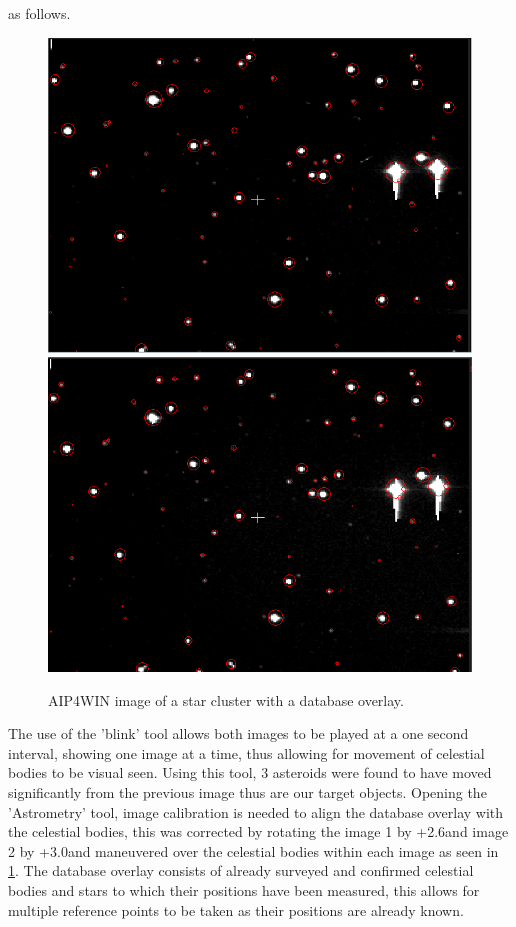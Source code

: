 \documentclass[12pt]{article}
\begin{document}
as follows.

\begin{figure}[H]
\begin{multicols}{2}
\centering
\includegraphics[scale=0.5]{Images/S2/dcdoverlay.PNG}
\includegraphics[scale=0.5]{Images/S2/dadoverlay.PNG}
\end{multicols}
\caption{AIP4WIN image of a star cluster with a database overlay.}
\label{Image Overlays}
\end{figure}

The use of the 'blink' tool allows both images to be played at a one second interval, showing one image at a time, thus allowing for movement of celestial bodies to be visual seen. Using this tool, 3 asteroids were found to have moved significantly from the previous image thus are our target objects. Opening the 'Astrometry' tool, image calibration is needed to align the database overlay with the celestial bodies, this was corrected by rotating the image 1 by  +2.6\textdegree and image 2 by +3.0\textdegree and maneuvered over the celestial bodies within each image as seen in \cref{Image Overlays}. The database overlay consists of already surveyed and confirmed celestial bodies and stars to which their positions have been measured, this allows for multiple reference points to be taken as their positions are already known. \\
\end{document}
